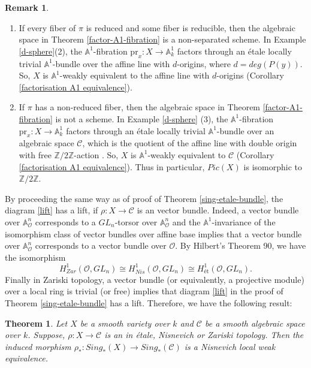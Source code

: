 \documentclass[11pt, reqno]{amsart}
\theoremstyle{plain}
\newtheorem{theorem}[thm]{Theorem}
\theoremstyle{definition}
\newtheorem{remark}[thm]{Remark}
\newcommand{\sC}{{\mathcal C}}
\newcommand{\A}{{\mathbb A}}
\newcommand{\Z}{{\mathbb Z}}
\begin{document}
	\begin{remark}~
				 \begin{enumerate}
			
			\item If every fiber of $\pi$ is reduced and some fiber is reducible, then the algebraic space in Theorem \ref{factor-A1-fibration} is a non-separated scheme. In Example \ref{d-sphere}(2), the $\mathbb{A}^1$-fibration $\text{pr}_x: X \to \A^1_k$ factors through an \'etale locally trivial $\mathbb{A}^1$-bundle over the affine line with $d$-origins, where $d=deg(P(y))$. So, $X$ is $\mathbb{A}^1$-weakly equivalent to the affine line with $d$-origins (Corollary \ref{factorisation A1 equivalence}).
			\item If $\pi$ has a non-reduced fiber, then the algebraic space in Theorem \ref{factor-A1-fibration} is not a scheme. In Example \ref{d-sphere} (3), the $\mathbb{A}^1$-fibration $\text{pr}_x: X \to \A^1_k$ factors through an \'etale locally trivial $\mathbb{A}^1$-bundle over an algebraic space $\mathcal{C}$, which is the quotient of the affine line with double origin with free $\mathbb{Z}/2\mathbb{Z}$-action \cite[Example 12]{doub}. So, $X$ is $\A^1$-weakly equivalent to $\sC$ (Corollary \ref{factorisation A1 equivalence}). Thus in particular, $Pic(X)$ is isomorphic to $\Z/2\Z$.
		\end{enumerate}
	\end{remark}
By proceeding the same way as of proof of Theorem \ref{sing-etale-bundle}, the diagram \ref{lift} has a lift, if $\rho: X \to \sC$ is an vector bundle. Indeed, a vector bundle over $\mathbb{A}^n_\mathcal{O}$ corresponds to a $GL_n$-torsor over $\mathbb{A}^n_\mathcal{O}$ and the $\mathbb{A}^1$-invariance of the isomorphism class of vector bundles over affine base \cite[Theorem 1]{asokI} implies that a vector bundle over $\mathbb{A}^n_{\mathcal{O}}$ corresponds to a vector bundle over $\mathcal{O}$.  By Hilbert's Theorem 90, we have the isomorphism
$$H^1_{Zar}(\mathcal{O}, GL_n) \cong H^1_{Nis}(\mathcal{O}, GL_n) \cong H^1_{\text{\'et}}(\mathcal{O}, GL_n).$$
Finally in Zariski topology, a vector bundle (or equivalently, a projective module) over a local ring is trivial (or free) implies that diagram \ref{lift} in the proof of Theorem \ref{sing-etale-bundle} has a lift. Therefore, we have the following result:
\begin{theorem} \label{general bundle}
		Let $X$ be a smooth variety over $k$ and $\mathcal{C}$ be a smooth algebraic space over $k$. Suppose, $\rho: X \to \mathcal{C}$ is an  in \'etale, Nisnevich or Zariski topology. %
		Then the induced morphism $\rho_*: Sing_*(X) \to Sing_*(\mathcal{C})$ is a Nisnevich local weak equivalence.
	\end{theorem} 
\end{document}
